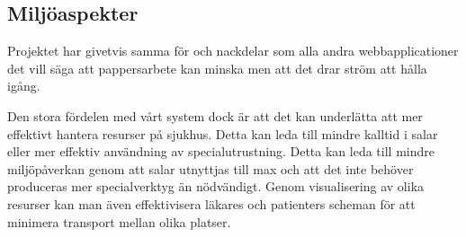 \subsection{Miljöaspekter}
Projektet har givetvis samma för och nackdelar som alla andra webbapplicationer det vill säga att pappersarbete kan minska men att det drar ström att hålla igång.

Den stora fördelen med vårt system dock är att det kan underlätta att mer effektivt hantera resurser på sjukhus. Detta kan leda till mindre kalltid i salar eller mer effektiv användning av specialutrustning. Detta kan leda till mindre miljöpåverkan genom att salar utnyttjas till max och att det inte behöver produceras mer specialverktyg än nödvändigt. Genom visualisering av olika resurser kan man även effektivisera läkares och patienters scheman för att minimera transport mellan olika platser. 
